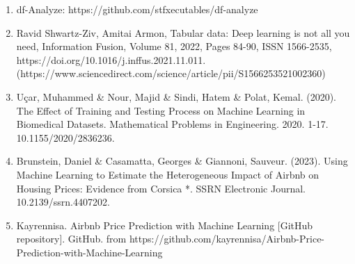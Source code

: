 \documentclass[a4paper,12pt]{article}
\begin{document}
\begin{enumerate}
  \item df-Analyze: https://github.com/stfxecutables/df-analyze
  \item Ravid Shwartz-Ziv, Amitai Armon, Tabular data: Deep learning is not all you need, Information Fusion, Volume 81, 2022, Pages 84-90, ISSN 1566-2535, https://doi.org/10.1016/j.inffus.2021.11.011. (https://www.sciencedirect.com/science/article/pii/S1566253521002360)
  \item Uçar, Muhammed \& Nour, Majid \& Sindi, Hatem \& Polat, Kemal. (2020). The Effect of Training and Testing Process on Machine Learning in Biomedical Datasets. Mathematical Problems in Engineering. 2020. 1-17. 10.1155/2020/2836236.
  \item Brunstein, Daniel \& Casamatta, Georges \& Giannoni, Sauveur. (2023). Using Machine Learning to Estimate the Heterogeneous Impact of Airbnb on Housing Prices: Evidence from Corsica *. SSRN Electronic Journal. 10.2139/ssrn.4407202.
  \item Kayrennisa. Airbnb Price Prediction with Machine Learning [GitHub repository]. GitHub. from https://github.com/kayrennisa/Airbnb-Price-Prediction-with-Machine-Learning
\end{enumerate}
\end{document}
